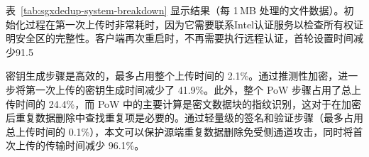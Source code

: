 表~\ref{tab:sgxdedup-system-breakdown} 显示结果（每 1\,MB 处理的文件数据）。初始化过程在第一次上传时非常耗时，因为它需要联系Intel认证服务以检查所有权证明安全区的完整性。客户端再次重启时，不再需要执行远程认证，首轮设置时间减少91.5%


密钥生成步骤是高效的，最多占用整个上传时间的 2.1\%。通过推测性加密，\sysnameS 进一步将第一次上传的密钥生成时间减少了 41.9\%。此外，整个 PoW 步骤占用了总上传时间的 24.4\%，而 PoW 中的主要计算是密文数据块的指纹识别，这对于在加密后重复数据删除中查找重复项是必要的。通过轻量级的签名和验证步骤（最多占用总上传时间的 0.1\%），本文可以保护源端重复数据删除免受侧通道攻击，同时将首次上传的传输时间减少 96.1\%。

